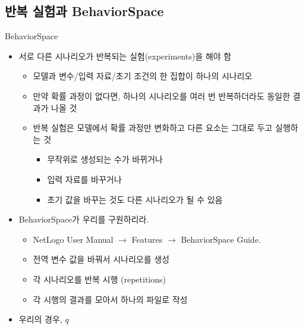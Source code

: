 \documentclass[hyperref={unicode}]{beamer}
\begin{document}
\subsection*{반복 실험과 BehaviorSpace}
\begin{frame}{BehaviorSpace}
\begin{itemize}
\item 서로 다른 시나리오가 반복되는 실험(experiments)을 해야 함
	\begin{itemize}
	\item 모델과 변수/입력 자료/초기 조건의 한 집합이 하나의 시나리오
	\item 만약 확률 과정이 없다면, 하나의 시나리오를 여러 번 반복하더라도 동일한 결과가 나올 것
	\item 반복 실험은 모델에서 확률 과정만 변화하고 다른 요소는 그대로 두고 실행하는 것
		\begin{itemize}
		\item 무작위로 생성되는 수가 바뀌거나
		\item 입력 자료를 바꾸거나
		\item 초기 값을 바꾸는 것도 다른 시나리오가 될 수 있음
		\end{itemize}
	\end{itemize}
\end{itemize}
\end{frame}

\begin{frame}
\begin{itemize}
\item BehaviorSpace가 우리를 구원하리라.
	\begin{itemize}
	\item NetLogo User Manual $\rightarrow$ Features $\rightarrow$ BehaviorSpace Guide.
	\item 전역 변수 값을 바꿔서 시나리오를 생성
	\item 각 시나리오를 반복 시행 (repetitions)
	\item 각 시행의 결과를 모아서 하나의 파일로 작성
	\end{itemize}
\item 우리의 경우, $q$
\end{itemize}	
\end{frame}



\end{document}
